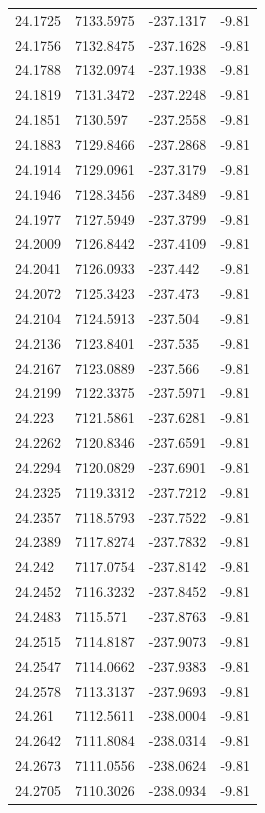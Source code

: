 \begin{table}[H]
\begin{tabular}{llll}
24.1725 & 7133.5975 & -237.1317 & -9.81 \\
24.1756 & 7132.8475 & -237.1628 & -9.81 \\
24.1788 & 7132.0974 & -237.1938 & -9.81 \\
24.1819 & 7131.3472 & -237.2248 & -9.81 \\
24.1851 & 7130.597 & -237.2558 & -9.81 \\
24.1883 & 7129.8466 & -237.2868 & -9.81 \\
24.1914 & 7129.0961 & -237.3179 & -9.81 \\
24.1946 & 7128.3456 & -237.3489 & -9.81 \\
24.1977 & 7127.5949 & -237.3799 & -9.81 \\
24.2009 & 7126.8442 & -237.4109 & -9.81 \\
24.2041 & 7126.0933 & -237.442 & -9.81 \\
24.2072 & 7125.3423 & -237.473 & -9.81 \\
24.2104 & 7124.5913 & -237.504 & -9.81 \\
24.2136 & 7123.8401 & -237.535 & -9.81 \\
24.2167 & 7123.0889 & -237.566 & -9.81 \\
24.2199 & 7122.3375 & -237.5971 & -9.81 \\
24.223 & 7121.5861 & -237.6281 & -9.81 \\
24.2262 & 7120.8346 & -237.6591 & -9.81 \\
24.2294 & 7120.0829 & -237.6901 & -9.81 \\
24.2325 & 7119.3312 & -237.7212 & -9.81 \\
24.2357 & 7118.5793 & -237.7522 & -9.81 \\
24.2389 & 7117.8274 & -237.7832 & -9.81 \\
24.242 & 7117.0754 & -237.8142 & -9.81 \\
24.2452 & 7116.3232 & -237.8452 & -9.81 \\
24.2483 & 7115.571 & -237.8763 & -9.81 \\
24.2515 & 7114.8187 & -237.9073 & -9.81 \\
24.2547 & 7114.0662 & -237.9383 & -9.81 \\
24.2578 & 7113.3137 & -237.9693 & -9.81 \\
24.261 & 7112.5611 & -238.0004 & -9.81 \\
24.2642 & 7111.8084 & -238.0314 & -9.81 \\
24.2673 & 7111.0556 & -238.0624 & -9.81 \\
24.2705 & 7110.3026 & -238.0934 & -9.81 \\

\end{tabular}
\end{table}
